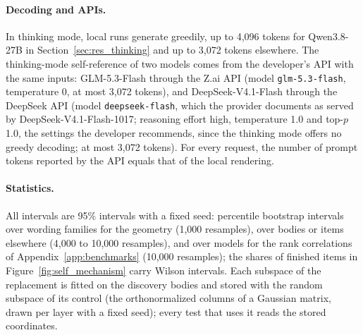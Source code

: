 \paragraph{Decoding and APIs.} In thinking mode, local runs generate greedily, up to 4,096 tokens for Qwen3.8-27B in Section~\ref{sec:res_thinking} and up to 3,072 tokens elsewhere. The thinking-mode self-reference of two models comes from the developer's API with the same inputs: GLM-5.3-Flash through the Z.ai API (model \texttt{glm-5.3-flash}, temperature 0, at most 3,072 tokens), and DeepSeek-V4.1-Flash through the DeepSeek API (model \texttt{deepseek-flash}, which the provider documents as served by DeepSeek-V4.1-Flash-1017; reasoning effort high, temperature 1.0 and top-$p$ 1.0, the settings the developer recommends, since the thinking mode offers no greedy decoding; at most 3,072 tokens). For every request, the number of prompt tokens reported by the API equals that of the local rendering.

\paragraph{Statistics.} All intervals are 95\% intervals with a fixed seed: percentile bootstrap intervals over wording families for the geometry (1,000 resamples), over bodies or items elsewhere (4,000 to 10,000 resamples), and over models for the rank correlations of Appendix~\ref{app:benchmarks} (10,000 resamples); the shares of finished items in Figure~\ref{fig:self_mechanism} carry Wilson intervals. Each subspace of the replacement is fitted on the discovery bodies and stored with the random subspace of its control (the orthonormalized columns of a Gaussian matrix, drawn per layer with a fixed seed); every test that uses it reads the stored coordinates.
